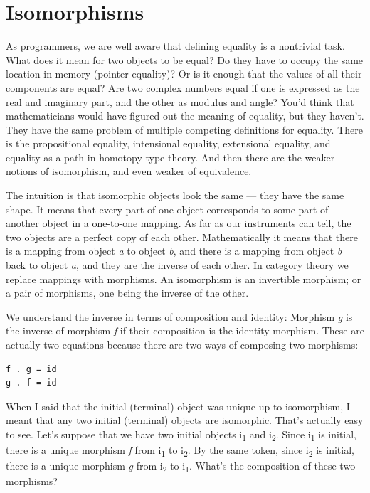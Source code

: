 \section{Isomorphisms}\label{isomorphisms}

As programmers, we are well aware that defining equality is a nontrivial
task. What does it mean for two objects to be equal? Do they have to
occupy the same location in memory (pointer equality)? Or is it enough
that the values of all their components are equal? Are two complex
numbers equal if one is expressed as the real and imaginary part, and
the other as modulus and angle? You'd think that mathematicians would
have figured out the meaning of equality, but they haven't. They have
the same problem of multiple competing definitions for equality. There
is the propositional equality, intensional equality, extensional
equality, and equality as a path in homotopy type theory. And then there
are the weaker notions of isomorphism, and even weaker of equivalence.

The intuition is that isomorphic objects look the same --- they have the
same shape. It means that every part of one object corresponds to some
part of another object in a one-to-one mapping. As far as our
instruments can tell, the two objects are a perfect copy of each other.
Mathematically it means that there is a mapping from object \emph{a} to
object \emph{b}, and there is a mapping from object \emph{b} back to
object \emph{a}, and they are the inverse of each other. In category
theory we replace mappings with morphisms. An isomorphism is an
invertible morphism; or a pair of morphisms, one being the inverse of
the other.

We understand the inverse in terms of composition and identity: Morphism
\emph{g} is the inverse of morphism \emph{f} if their composition is the
identity morphism. These are actually two equations because there are
two ways of composing two morphisms:

\begin{Verbatim}[commandchars=\\\{\}]
f . g = id
g . f = id
\end{Verbatim}
When I said that the initial (terminal) object was unique up to
isomorphism, I meant that any two initial (terminal) objects are
isomorphic. That's actually easy to see. Let's suppose that we have two
initial objects i\textsubscript{1} and i\textsubscript{2}. Since
i\textsubscript{1} is initial, there is a unique morphism \emph{f} from
i\textsubscript{1} to i\textsubscript{2}. By the same token, since
i\textsubscript{2} is initial, there is a unique morphism \emph{g} from
i\textsubscript{2} to i\textsubscript{1}. What's the composition of
these two morphisms?

